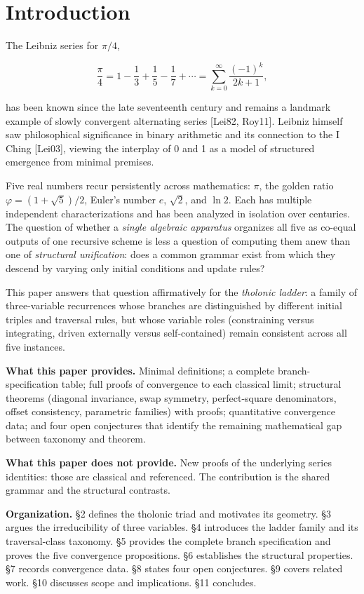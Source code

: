 \documentclass[12pt]{article}
\begin{document}
\section{Introduction}\label{introduction}

The Leibniz series for \(\pi/4\),

\[\frac{\pi}{4} = 1 - \frac{1}{3} + \frac{1}{5} - \frac{1}{7} + \cdots = \sum_{k=0}^{\infty} \frac{(-1)^k}{2k+1},\]

has been known since the late seventeenth century and remains a landmark
example of slowly convergent alternating series {[}Lei82, Roy11{]}.
Leibniz himself saw philosophical significance in binary arithmetic and
its connection to the I Ching {[}Lei03{]}, viewing the interplay of 0
and 1 as a model of structured emergence from minimal premises.

Five real numbers recur persistently across mathematics: \(\pi\), the
golden ratio \(\varphi = (1+\sqrt{5})/2\), Euler's number \(e\),
\(\sqrt{2}\), and \(\ln 2\). Each has multiple independent
characterizations and has been analyzed in isolation over centuries. The
question of whether a \emph{single algebraic apparatus} organizes all
five as co-equal outputs of one recursive scheme is less a question of
computing them anew than one of \emph{structural unification}: does a
common grammar exist from which they descend by varying only initial
conditions and update rules?

This paper answers that question affirmatively for the \emph{tholonic
ladder}: a family of three-variable recurrences whose branches are
distinguished by different initial triples and traversal rules, but
whose variable roles (constraining versus integrating, driven externally
versus self-contained) remain consistent across all five instances.

\textbf{What this paper provides.} Minimal definitions; a complete
branch-specification table; full proofs of convergence to each classical
limit; structural theorems (diagonal invariance, swap symmetry,
perfect-square denominators, offset consistency, parametric families)
with proofs; quantitative convergence data; and four open conjectures
that identify the remaining mathematical gap between taxonomy and
theorem.

\textbf{What this paper does not provide.} New proofs of the underlying
series identities: those are classical and referenced. The contribution
is the shared grammar and the structural contrasts.

\textbf{Organization.} §2 defines the tholonic triad and motivates its
geometry. §3 argues the irreducibility of three variables. §4 introduces
the ladder family and its traversal-class taxonomy. §5 provides the
complete branch specification and proves the five convergence
propositions. §6 establishes the structural properties. §7 records
convergence data. §8 states four open conjectures. §9 covers related
work. §10 discusses scope and implications. §11 concludes.
\end{document}
